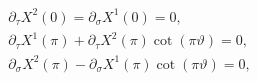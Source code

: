 \begin{equation}
\label{bc}
\begin{array}{l}
\partial_{\tau}X^{2}(0)=\partial_{\sigma}X^{1}(0)=0, \\
\partial_{\tau}X^{1}(\pi)+\partial_{\tau}X^{2}(\pi)\cot(\pi\vartheta)=0, \\
\partial_{\sigma}X^{2}(\pi)-\partial_{\sigma}X^{1}(\pi)\cot(\pi\vartheta)=0,
\end{array}
\end{equation}

